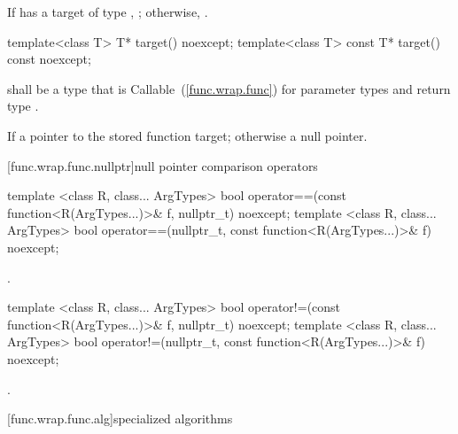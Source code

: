 \begin{itemdescr}
\pnum\returns If  has a target of type ,
  ; otherwise, .
\end{itemdescr}

%
%
\begin{itemdecl}
template<class T>       T* target() noexcept;
template<class T> const T* target() const noexcept;
\end{itemdecl}

\begin{itemdescr}
\pnum
\requires {} shall be a type that is
Callable~(\ref{func.wrap.func}) for parameter types
and return type .

\pnum\returns If 
a pointer to the stored function target; otherwise a null pointer.
\end{itemdescr}

[func.wrap.func.nullptr]{null pointer comparison operators}

%
%
\begin{itemdecl}
template <class R, class... ArgTypes>
  bool operator==(const function<R(ArgTypes...)>& f, nullptr_t) noexcept;
template <class R, class... ArgTypes>
  bool operator==(nullptr_t, const function<R(ArgTypes...)>& f) noexcept;
\end{itemdecl}

\begin{itemdescr}
\pnum\returns {}.
\end{itemdescr}

%
%
\begin{itemdecl}
template <class R, class... ArgTypes>
  bool operator!=(const function<R(ArgTypes...)>& f, nullptr_t) noexcept;
template <class R, class... ArgTypes>
  bool operator!=(nullptr_t, const function<R(ArgTypes...)>& f) noexcept;
\end{itemdecl}

\begin{itemdescr}
\pnum\returns {}.
\end{itemdescr}

[func.wrap.func.alg]{specialized algorithms}

